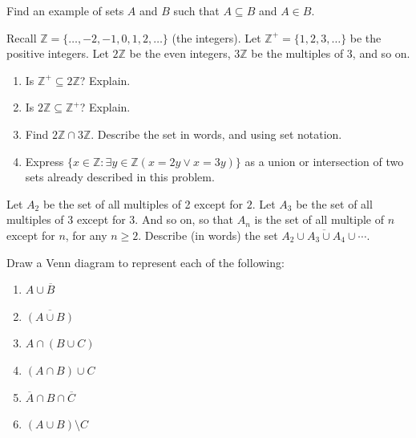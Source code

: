 \documentclass[10pt,]{book}
\theoremstyle{plain}
\theoremstyle{definition}
\theoremstyle{definition}
\theoremstyle{definition}
\theoremstyle{definition}
\numberwithin{equation}{chapter}
\def\Z{\mathbb Z}
\def\st{:}
\def\bar{\overline}
\begin{document}
\begin{divisionexercise}{4}\hypertarget{exercise-190}{}
\hypertarget{p-1550}{}%
Find an example of sets \(A\) and \(B\) such that \(A \subseteq B\) and \(A \in B\).%
\end{divisionexercise}%
\begin{divisionexercise}{5}\hypertarget{exercise-191}{}
\hypertarget{p-1552}{}%
Recall \(\Z = \{\ldots,-2,-1,0, 1,2,\ldots\}\) (the integers). Let \(\Z^+ = \{1, 2, 3, \ldots\}\) be the positive integers. Let \(2\Z\) be the even integers, \(3\Z\) be the multiples of 3, and so on.%
\par
\hypertarget{p-1553}{}%
\leavevmode%
\begin{enumerate}[label=(\alph*)]
\item\hypertarget{li-500}{}\hypertarget{p-1554}{}%
Is \(\Z^+ \subseteq 2\Z\)? Explain.%
\item\hypertarget{li-501}{}\hypertarget{p-1555}{}%
Is \(2\Z \subseteq \Z^+\)? Explain.%
\item\hypertarget{li-502}{}\hypertarget{p-1556}{}%
Find \(2\Z \cap 3\Z\). Describe the set in words, and using set notation.%
\item\hypertarget{li-503}{}\hypertarget{p-1557}{}%
Express \(\{x \in \Z \st \exists y\in \Z (x = 2y \vee x = 3y)\}\) as a union or intersection of two sets already described in this problem.%
\end{enumerate}
%
\end{divisionexercise}%
\begin{divisionexercise}{6}\hypertarget{exercise-192}{}
\hypertarget{p-1561}{}%
Let \(A_2\) be the set of all multiples of 2 except for \(2\). Let \(A_3\) be the set of all multiples of 3 except for 3. And so on, so that \(A_n\) is the set of all multiple of \(n\) except for \(n\), for any \(n \ge 2\). Describe (in words) the set \(\bar{A_2 \cup A_3 \cup A_4 \cup \cdots}\).%
\end{divisionexercise}%
\begin{divisionexercise}{7}\hypertarget{exercise-193}{}
\hypertarget{p-1562}{}%
Draw a Venn diagram to represent each of the following: \leavevmode%
\begin{enumerate}[label=(\alph*)]
\item\hypertarget{li-508}{}\(A \cup \bar B\)%
\item\hypertarget{li-509}{}\(\bar{(A \cup B)}\)%
\item\hypertarget{li-510}{}\(A \cap (B \cup C)\)%
\item\hypertarget{li-511}{}\((A \cap B) \cup C\)%
\item\hypertarget{li-512}{}\(\bar A \cap B \cap \bar C\)%
\item\hypertarget{li-513}{}\((A \cup B) \setminus C\)%
\end{enumerate}
%
\end{divisionexercise}%
\end{document}
